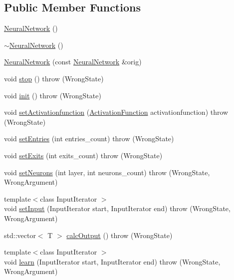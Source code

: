 \subsection*{\-Public \-Member \-Functions}
\begin{DoxyCompactItemize}
\item 
\hyperlink{class_neural_network_ade5d1724706351407fdf6acf613ac8c8}{\-Neural\-Network} ()
\item 
\hyperlink{class_neural_network_a4c1e3cc6dc0114260c17f0a5ea8e9981}{$\sim$\-Neural\-Network} ()
\item 
\hyperlink{class_neural_network_a4ce7e819f755461926a92668aab811e2}{\-Neural\-Network} (const \hyperlink{class_neural_network}{\-Neural\-Network} \&orig)
\item 
void \hyperlink{class_neural_network_aaf6e7c89c53dcc4f4b2c71f8d25a9741}{stop} ()  throw (\-Wrong\-State)
\item 
void \hyperlink{class_neural_network_aa83131836c86cd3e60ddb46a17b164a5}{init} ()  throw (\-Wrong\-State)
\item 
void \hyperlink{class_neural_network_acfdd9905e047fff1b40e4cd358160f6e}{set\-Activationfunction} (\hyperlink{class_activation_function}{\-Activation\-Function} activationfunction)  throw (\-Wrong\-State)
\item 
void \hyperlink{class_neural_network_a705286b62e4d1d11310f997dadd31fa8}{set\-Entries} (int entries\-\_\-count)  throw (\-Wrong\-State)
\item 
void \hyperlink{class_neural_network_a18912fbb8068bfb301d6e2462c9f8a31}{set\-Exits} (int exits\-\_\-count)  throw (\-Wrong\-State)
\item 
void \hyperlink{class_neural_network_ab3c70e006390624a5b9bd2c933b8af56}{set\-Neurons} (int layer, int neurons\-\_\-count)  throw (\-Wrong\-State, Wrong\-Argument)
\item 
{\footnotesize template$<$class Input\-Iterator $>$ }\\void \hyperlink{class_neural_network_aaf64536a908b15b76faa8e19216d9219}{set\-Input} (\-Input\-Iterator start, \-Input\-Iterator end)  throw (\-Wrong\-State, Wrong\-Argument)
\item 
std\-::vector$<$ \-T $>$ \hyperlink{class_neural_network_af7c28ad226f6d32d8c578159f0d03ae9}{calc\-Output} ()  throw (\-Wrong\-State)
\item 
{\footnotesize template$<$class Input\-Iterator $>$ }\\void \hyperlink{class_neural_network_a814f14ae36ecb286923f7fff6cff7aa7}{learn} (\-Input\-Iterator start, \-Input\-Iterator end)  throw (\-Wrong\-State, Wrong\-Argument)

\end{DoxyCompactItemize}

